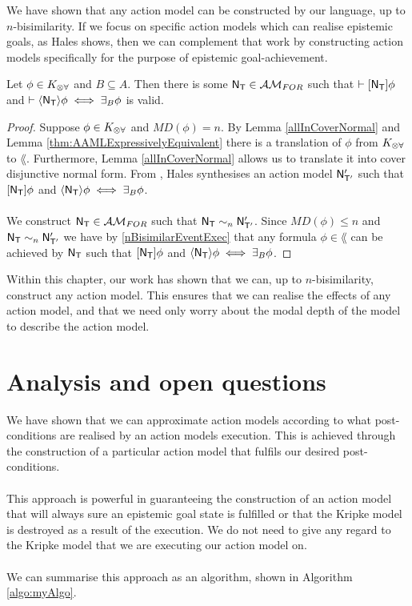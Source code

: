 We have shown that any action model can be constructed by our language, up to $n$-bisimilarity.
If we focus on specific action models which can realise epistemic goals, as Hales
\cite{hales13synthesis} shows, then we can complement that work by constructing action models
specifically for the purpose of epistemic goal-achievement.

\begin{corr} \label{approximatingBRestricted}
Let $\phi \in K_{\otimes\forall}$ and $B \subseteq A$.
Then there is some $\mathrm{\mathsf{N}}_\mathrm{\mathsf{T}} \in \mathcal{AM}_{FOR}$ such that $\vdash [{\mathrm{\mathsf{N}}_\mathrm{\mathsf{T}}}] \phi$ and
$\vdash \langle { \ensuremath {\mathrm{\mathsf{N}}} _ \ensuremath {\mathrm{\mathsf{T}}} } \rangle \phi \iff \exists_B \phi$ is valid.
\end{corr}

\begin{proof}
Suppose $\phi \in K_{\otimes\forall}$ and $MD(\phi) = n$.
By Lemma \ref{allInCoverNormal} and Lemma \ref{thm:AAMLExpressivelyEquivalent} there is a translation of $\phi$ from $K_{\otimes\forall}$ to $\lang$.
Furthermore, Lemma \ref{allInCoverNormal} allows us to translate it into cover disjunctive normal form.
From \cite{hales13synthesis}, Hales synthesises an action model $\mathrm{\mathsf{N}}'_{\mathrm{\mathsf{T}}'}$ such that $[{\mathrm{\mathsf{N}}_\mathrm{\mathsf{T}}}] \phi$ and $\langle { \ensuremath {\mathrm{\mathsf{N}}} _ \ensuremath {\mathrm{\mathsf{T}}} } \rangle
\phi \iff \exists_B \phi$.\\
\\
We construct $\mathrm{\mathsf{N}}_\mathrm{\mathsf{T}} \in \mathcal{AM}_{FOR}$ such that $\mathrm{\mathsf{N}}_\mathrm{\mathsf{T}} \sim_n \mathrm{\mathsf{N}}'_{\mathrm{\mathsf{T}}'}$.
Since $MD(\phi) \leq n$ and $\mathrm{\mathsf{N}}_\mathrm{\mathsf{T}} \sim_n \mathrm{\mathsf{N}}'_{\mathrm{\mathsf{T}}'}$ we have by \ref{nBisimilarEventExec} that any
formula $\phi \in \lang$ can be achieved by $\mathrm{\mathsf{N}}_\mathrm{\mathsf{T}}$ such that $[{\mathrm{\mathsf{N}}_\mathrm{\mathsf{T}}}] \phi$ and $\langle { \ensuremath {\mathrm{\mathsf{N}}} _ \ensuremath {\mathrm{\mathsf{T}}} } \rangle \phi
\iff \exists_B \phi$.
\end{proof}

Within this chapter, our work has shown that we can, up to $n$-bisimilarity,
construct any action
model.
This ensures that we can realise the effects of any action model, and that we need only worry about
the modal depth of the model to describe the action model.

\section{Analysis and open questions} \label{subsec:multi:sequentCalc}

We have shown that we can approximate action models according to what
post-conditions are realised by an action models execution.
This is achieved through the construction of a particular action model that fulfils
our desired post-conditions.\\
\\
This approach is powerful in guaranteeing the construction of an action model
that will always sure an epistemic goal state is fulfilled or that the Kripke
model is destroyed as a result of the execution.
We do not need to give any regard to the Kripke model that we are executing our
action model on.\\
\\
We can summarise this approach as an algorithm, shown in Algorithm \ref{algo:myAlgo}.

